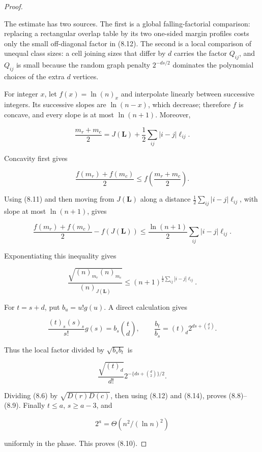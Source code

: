 \documentclass[11pt,reqno]{amsart}
\begin{document}
\begin{proof}\label{proof-5}

The estimate has two sources.  The first is a global falling-factorial
comparison: replacing a rectangular overlap table by its two one-sided
margin profiles costs only the small off-diagonal factor in (8.12).  The
second is a local comparison of unequal class sizes: a cell joining sizes
that differ by \(d\) carries the factor \(Q_{ij}\), and \(Q_{ij}\) is small
because the random graph penalty \(2^{-ds/2}\) dominates the polynomial
choices of the extra \(d\) vertices.

For integer \(x\), let \(f(x)=\ln(n)_x\) and interpolate
linearly between successive integers. Its successive slopes are
\(\ln(n-x)\), which decrease; therefore \(f\) is concave, and
every slope is at most \(\ln(n+1)\). Moreover,

\[
 \frac{m_r+m_c}{2}
 =J(\mathbf L)+\frac12\sum_{ij}|i-j|\ell_{ij}.                  \tag{8.11}
\]

Concavity first gives

\[
 \frac{f(m_r)+f(m_c)}2
 \le f\!\left(\frac{m_r+m_c}{2}\right).
\]

Using (8.11) and then moving from \(J(\mathbf L)\) along a distance
\(\frac12\sum_{ij}|i-j|\ell_{ij}\), with slope at most
\(\ln(n+1)\), gives

\[
 \frac{f(m_r)+f(m_c)}2-f(J(\mathbf L))
 \le\frac{\ln(n+1)}2\sum_{ij}|i-j|\ell_{ij}.
\]

Exponentiating this inequality gives

\[
 \frac{\sqrt{(n)_{m_r}(n)_{m_c}}}{(n)_{J(\mathbf L)}}
 \le(n+1)^{\frac12\sum_{ij}|i-j|\ell_{ij}}.            \tag{8.12}
\]

For \(t=s+d\), put \(b_u=u!g(u)\). A direct calculation gives

\[
 \frac{(t)_s(s)_s}{s!}g(s)=b_s\binom td,\qquad
 \frac{b_t}{b_s}=(t)_d2^{ds+\binom d2}.                 \tag{8.13}
\]

Thus the local factor divided by \(\sqrt{b_s b_t}\) is

\[
 \frac{\sqrt{(t)_d}}{d!}2^{-\{ds+\binom d2\}/2}.        \tag{8.14}
\]

Dividing (8.6) by \(\sqrt{D(r)D(c)}\), then using (8.12) and (8.14),
proves (8.8)--(8.9). Finally \(t\le a\),
\(s\ge a-3\), and

\[
 2^a=\Theta(n^2/(\ln n)^2)                                    \tag{8.15}
\]

uniformly in the phase. This proves (8.10).
\end{proof}
\end{document}
